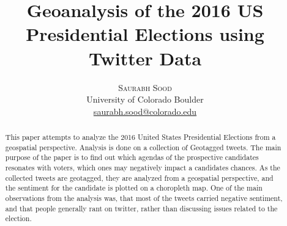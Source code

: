 \documentclass[twoside]{article}
\title{\vspace{-15mm}\fontsize{24pt}{10pt}\selectfont\textbf{Geoanalysis of the 2016 US Presidential Elections using Twitter Data}} %
\author{
\large
\textsc{Saurabh Sood} \\
\normalsize University of Colorado Boulder \\ %
\normalsize \href{mailto:saurabh.sood@@colorado.edu}{saurabh.sood@colorado.edu} %
\vspace{-5mm}
}
\date{}
\begin{document}
\maketitle %

\thispagestyle{fancy} %


\begin{abstract}
This paper attempts to analyze the 2016 United States Presidential Elections from a geospatial perspective. Analysis is done on a collection of Geotagged tweets. The main purpose of the paper is to find out which agendas of the prospective candidates resonates with voters, which ones may negatively impact a candidates chances. As the collected tweets are geotagged, they are analyzed from a geospatial perspective, and the sentiment for the candidate is plotted on a choropleth map. One of the main observations from the analysis was, that most of the tweets carried negative sentiment, and that people generally rant on twitter, rather than discussing issues related to the election.
\end{abstract}

\end{document}
